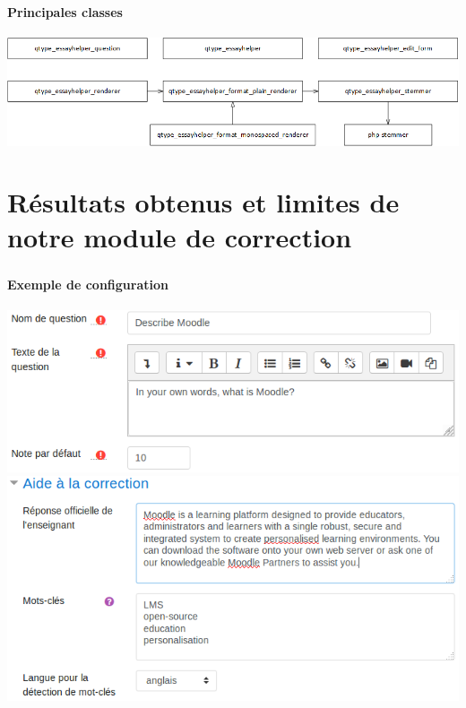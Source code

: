 \documentclass{beamer}
\begin{document}
  \begin{frame}
  \frametitle{\insertsection}
  \framesubtitle{Principales classes}
  \begin{center}
    \includegraphics[scale=0.4]{../images/class-simple.png}
  \end{center}
  \end{frame}
  
  \section[R\'esultats]{R\'esultats obtenus et limites de notre module de correction}
  \begin{frame}
  \frametitle{\insertsection}
  \framesubtitle{Exemple de configuration}
  \begin{center}
    \includegraphics[scale=0.4]{../images/questionform_base.png}
    \includegraphics[scale=0.4]{../images/questionform_helper.png}
  \end{center}
  \end{frame}
  
\end{document}
